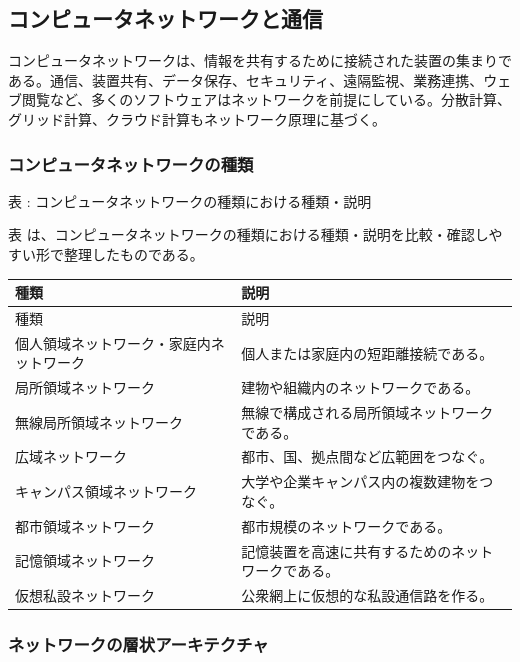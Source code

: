 \subsection{コンピュータネットワークと通信}

コンピュータネットワークは、情報を共有するために接続された装置の集まりである。通信、装置共有、データ保存、セキュリティ、遠隔監視、業務連携、ウェブ閲覧など、多くのソフトウェアはネットワークを前提にしている。分散計算、グリッド計算、クラウド計算もネットワーク原理に基づく。

\subsubsection{コンピュータネットワークの種類}

\par\smallskip\noindent{}\label{tab:ch16-22}表 \thetable: コンピュータネットワークの種類における種類・説明\par\smallskip
表 \thetable は、コンピュータネットワークの種類における種類・説明を比較・確認しやすい形で整理したものである。\par\smallskip
\begin{longtable}{>{\raggedright\arraybackslash}p{}>{\raggedright\arraybackslash}p{}}
\toprule
種類 & 説明 \\
\midrule
\endfirsthead
\toprule
種類 & 説明 \\
\midrule
\endhead
個人領域ネットワーク・家庭内ネットワーク & 個人または家庭内の短距離接続である。 \\
局所領域ネットワーク & 建物や組織内のネットワークである。 \\
無線局所領域ネットワーク & 無線で構成される局所領域ネットワークである。 \\
広域ネットワーク & 都市、国、拠点間など広範囲をつなぐ。 \\
キャンパス領域ネットワーク & 大学や企業キャンパス内の複数建物をつなぐ。 \\
都市領域ネットワーク & 都市規模のネットワークである。 \\
記憶領域ネットワーク & 記憶装置を高速に共有するためのネットワークである。 \\
仮想私設ネットワーク & 公衆網上に仮想的な私設通信路を作る。 \\
\bottomrule
\end{longtable}

\subsubsection{ネットワークの層状アーキテクチャ}

